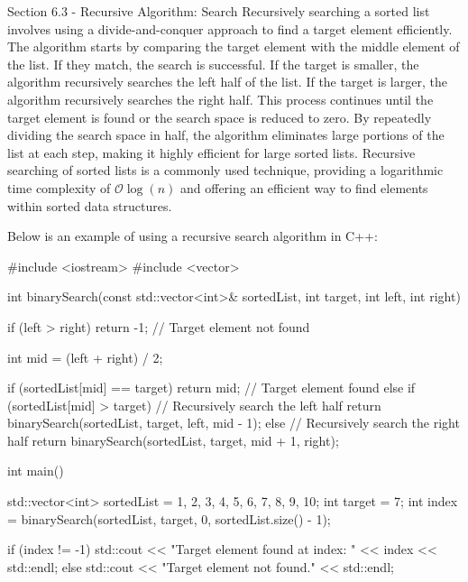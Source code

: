 \begin{notes}{Section 6.3 - Recursive Algorithm: Search}
    Recursively searching a sorted list involves using a divide-and-conquer approach to find a target element efficiently. The algorithm starts by comparing the target element with the middle element of the list. If they match, the search is successful. If the target is smaller, the algorithm recursively 
    searches the left half of the list. If the target is larger, the algorithm recursively searches the right half. This process continues until the target element is found or the search space is reduced to zero. By repeatedly dividing the search space in half, the algorithm eliminates large portions of 
    the list at each step, making it highly efficient for large sorted lists. Recursive searching of sorted lists is a commonly used technique, providing a logarithmic time complexity of $\mathcal{O}\log{(n)}$ and offering an efficient way to find elements within sorted data structures.
    
    \begin{highlight}
        Below is an example of using a recursive search algorithm in C++:
    
    \begin{code}[C++]
    #include <iostream>
    #include <vector>
    
    int binarySearch(const std::vector<int>& sortedList, int target, 
                    int left, int right) {
        if (left > right) {
            return -1; // Target element not found
        }
    
        int mid = (left + right) / 2;
    
        if (sortedList[mid] == target) {
            return mid; // Target element found
        } else if (sortedList[mid] > target) {
            // Recursively search the left half
            return binarySearch(sortedList, target, left, mid - 1);
        } else {
            // Recursively search the right half
            return binarySearch(sortedList, target, mid + 1, right);
        }
    }
    
    int main() {
        std::vector<int> sortedList = {1, 2, 3, 4, 5, 6, 7, 8, 9, 10};
        int target = 7;
        int index = binarySearch(sortedList, target, 0, sortedList.size() - 1);
    
        if (index != -1) {
            std::cout << "Target element found at index: " << index << std::endl;
        } else {
            std::cout << "Target element not found." << std::endl;
        }
    
}
\end{code}
\end{highlight}
\end{notes}
